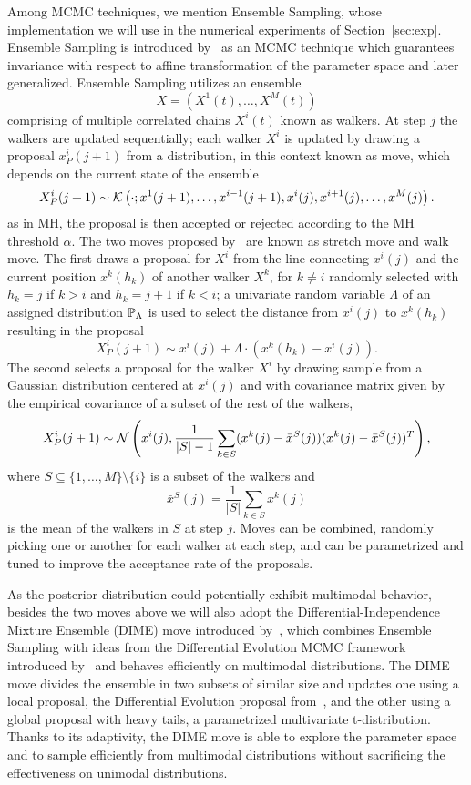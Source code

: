 Among MCMC techniques, we mention Ensemble Sampling, whose implementation we will use in the numerical experiments of Section~\ref{sec:exp}.
Ensemble Sampling is introduced by~\cite{GoodmanWeare} as an MCMC technique which guarantees invariance with respect to affine transformation of the parameter space and later generalized.
Ensemble Sampling utilizes an ensemble 
\[
X =(X^1(t), \dots , X^M(t))
\] 
comprising of multiple correlated chains $X^i(t)$ known as walkers.
At step $j$ the walkers are updated sequentially; each walker $X^i$ is updated by drawing a proposal $x^i_P(j+1)$ from a distribution, in this context known as move, which depends on the current state of the ensemble 
\[
  X^i_P(j+1) \sim \mathcal K\left( \cdot ; x^1(j+1), \dots, x^{i-1}(j+1), x^i(j), x^{i+1}(j), \dots, x^M(j)\right).
\] as in MH, the proposal is then accepted or rejected according to the MH threshold $\alpha$. \newline
The two moves proposed by~\cite{GoodmanWeare} are known as stretch move and walk move.
The first draws a proposal for $X^i$ from the line connecting $x^i(j)$ and the current position $x^k(h_k)$ of another walker $X^k$, for $k \neq i$ randomly selected with $h_k = j$ if $k > i$ and $h_k = j+1$ if $k < i$; a univariate random variable $\Lambda$ of an assigned distribution $\mathbb P_\Lambda$ is used to select the distance from $x^i(j)$ to $x^k(h_k)$ resulting in the proposal
\begin{equation}\label{eq:stretch-move}
    X^i_P(j+1) \sim x^i(j) + \Lambda \cdot (x^k(h_k) - x^i(j)).
\end{equation}
The second selects a proposal for the walker $X^i$ by drawing sample from a Gaussian distribution centered at $x^i(j)$ and with covariance matrix given by the empirical covariance of a subset of the rest of the walkers,
\begin{equation}\label{eq:walk-move}
    X^i_P(j+1) \sim \mathcal N\left( x^i(j), \frac{1}{|S|-1} \sum_{k \in S} (x^k(j) - \bar x^S(j))(x^k(j) - \bar x^S(j))^T \right),
\end{equation}
where $S \subseteq \{1, \dots, M\} \setminus \{i\}$ is a subset of the walkers and \[\bar x^S(j) = \frac{1}{|S|}\sum_{k \in S} x^k(j)\] is the mean of the walkers in $S$ at step $j$.
Moves can be combined, randomly picking one or another for each walker at each step, and can be parametrized and tuned to improve the acceptance rate of the proposals.

As the posterior distribution could potentially exhibit multimodal behavior, besides the two moves above we will also adopt the Differential-Independence Mixture Ensemble (DIME) move introduced by~\cite{Boehl}, which combines Ensemble Sampling with ideas from the Differential Evolution MCMC framework introduced by~\cite{TerBraak} and behaves efficiently on multimodal distributions. 
The DIME move divides the ensemble in two subsets of similar size and updates one using a local proposal, the Differential Evolution proposal from~\cite{TerBraak}, and the other using a global proposal with heavy tails, a parametrized multivariate t-distribution.
Thanks to its adaptivity, the DIME move is able to explore the parameter space and to sample efficiently from multimodal distributions without sacrificing the effectiveness on unimodal distributions.

